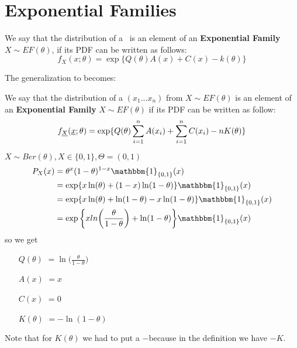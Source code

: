 \section{Exponential Families}
\begin{defi}
	We say that the distribution of a \rv \  is an element of an \textbf{Exponential Family}	$X\sim EF(\theta)$, if its PDF can be written as follows:
	$$f_X(x;\theta)=\exp \{ Q(\theta)A(x)+ C(x) -k(\theta) \}$$
\end{defi}
The generalization to \rs becomes:
\begin{defi}
	We say that the distribution of a \rs $(x_1...x_n)$ from $X\sim EF(\theta)$ is an element of an \textbf{Exponential Family}	$X\sim EF(\theta)$ if its PDF can be written as follow:
	$$f_{\underline X}(\underline{x};\theta)=\exp \{ Q(\theta)\sum_{i=1}^{n}A(x_i)+ \sum_{i=1}^{n} C(x_i) -nK(\theta) \}$$
\end{defi}
\begin{eg}
	$X\sim Ber(\theta),X\in\{0,1\}, \Theta=(0,1)$
	\[
	\begin{split}
	P_X(x)
	&=\theta^x (1-\theta)^{1-x}\mathbbm{1}_{\{0,1\}}(x)\\
	&=\exp\{x\ln(\theta)+(1-x)\ln(1-\theta)  \}\mathbbm{1}_{\{0,1\}}(x)\\
	&=\exp\{x\ln(\theta)+\ln(1-\theta)-x\ln(1-\theta)  \}\mathbbm{1}_{\{0,1\}}(x)\\
	&=\exp\bigg\{xln{\bigg(\frac{\theta}{1-\theta}\bigg)}+\ln(1-\theta)\bigg\}\mathbbm{1}_{\{0,1\}}(x)
	\end{split}
	\]
	so we get 
	\begin{itemize}
		\item[$Q(\theta)$]$=\ln\bigg( \frac{\theta}{1-\theta} \bigg)$
		\item[$A(x)$]$=x$
		\item[$C(x)$]$=0$
		\item[$K(\theta)$]$=-\ln(1-\theta)$
	\end{itemize}
	Note that for $K(\theta)$ we had to put a $-$because in the definition we have $-K$.
\end{eg}

